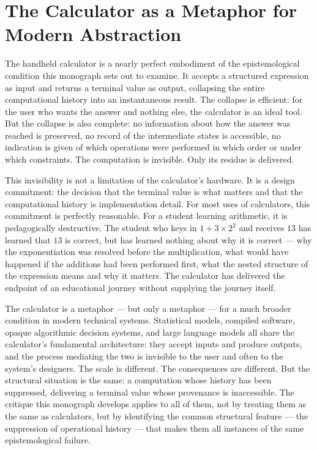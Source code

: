 \documentclass[12pt,openany]{book}
\theoremstyle{plain}
\theoremstyle{definition}
\theoremstyle{remark}
\begin{document}
\section*{The Calculator as a Metaphor for Modern Abstraction}

The handheld calculator is a nearly perfect embodiment of the epistemological condition this monograph sets out to examine. It accepts a structured expression as input and returns a terminal value as output, collapsing the entire computational history into an instantaneous result. The collapse is efficient: for the user who wants the answer and nothing else, the calculator is an ideal tool. But the collapse is also complete: no information about how the answer was reached is preserved, no record of the intermediate states is accessible, no indication is given of which operations were performed in which order or under which constraints. The computation is invisible. Only its residue is delivered.

This invisibility is not a limitation of the calculator's hardware. It is a design commitment: the decision that the terminal value is what matters and that the computational history is implementation detail. For most uses of calculators, this commitment is perfectly reasonable. For a student learning arithmetic, it is pedagogically destructive. The student who keys in $1 + 3 \times 2^2$ and receives $13$ has learned that $13$ is correct, but has learned nothing about why it is correct — why the exponentiation was resolved before the multiplication, what would have happened if the additions had been performed first, what the nested structure of the expression means and why it matters. The calculator has delivered the endpoint of an educational journey without supplying the journey itself.

The calculator is a metaphor — but only a metaphor — for a much broader condition in modern technical systems. Statistical models, compiled software, opaque algorithmic decision systems, and large language models all share the calculator's fundamental architecture: they accept inputs and produce outputs, and the process mediating the two is invisible to the user and often to the system's designers. The scale is different. The consequences are different. But the structural situation is the same: a computation whose history has been suppressed, delivering a terminal value whose provenance is inaccessible. The critique this monograph develops applies to all of them, not by treating them as the same as calculators, but by identifying the common structural feature — the suppression of operational history — that makes them all instances of the same epistemological failure.
\end{document}
